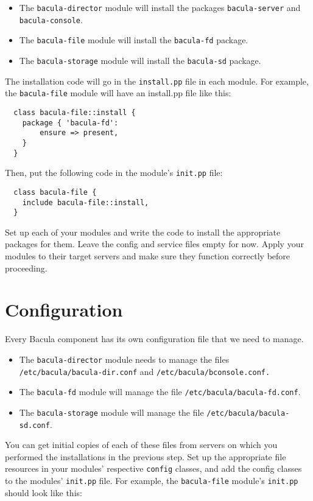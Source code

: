 \documentclass{article}   	%
\begin{document}
\begin{itemize}
	\item The \texttt{bacula-director} module will install the packages \texttt{bacula-server} and \texttt{bacula-console}.
	\item The \texttt{bacula-file} module will install the \texttt{bacula-fd} package.
	\item The \texttt{bacula-storage} module will install the \texttt{bacula-sd} package.
\end{itemize}

The installation code will go in the \texttt{install.pp} file in each module.  For example, the \texttt{bacula-file} module will have an install.pp file like this:

\begin{verbatim}
  class bacula-file::install {
    package { 'bacula-fd': 
        ensure => present,
    }
  }
\end{verbatim}

Then, put the following code in the module's \texttt{init.pp} file:

\begin{verbatim}
  class bacula-file {
    include bacula-file::install,
  }
\end{verbatim}

Set up each of your modules and write the code to install the appropriate packages for them.  Leave the config and service files empty for now.  Apply your modules to their target servers and make sure they function correctly before proceeding.

\section{Configuration}
Every Bacula component has its own configuration file that we need to manage.  

\begin{itemize}
	\item The \texttt{bacula-director} module needs to manage the files \texttt{/etc/bacula/bacula-dir.conf} and \texttt{/etc/bacula/bconsole.conf.}
	\item The \texttt{bacula-fd} module will manage the file \texttt{/etc/bacula/bacula-fd.conf}.
	\item The \texttt{bacula-storage} module will manage the file \texttt{/etc/bacula/bacula-sd.conf}.
\end{itemize}

You can get initial copies of each of these files from servers on which you performed the installations in the previous step. Set up the appropriate file resources in your modules' respective \texttt{config} classes, and add the config classes to the modules' \texttt{init.pp} file.  For example, the \texttt{bacula-file} module's \texttt{init.pp} should look like this:
\end{document}
